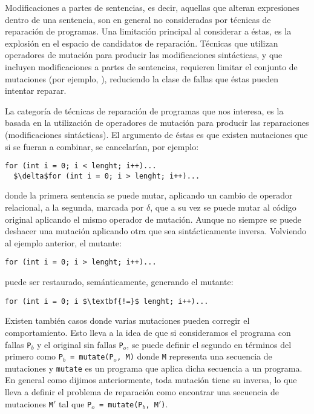 Modificaciones a partes de sentencias, es decir, aquellas que alteran expresiones dentro de una sentencia, son en general no consideradas por t\'ecnicas de reparaci\'on de programas. Una limitaci\'on principal al considerar a \'estas, es la explosi\'on en el espacio de candidatos de reparaci\'on. T\'ecnicas que utilizan operadores de mutaci\'on para producir las modificaciones sint\'acticas, y que incluyen modificaciones a partes de sentencias, requieren limitar el conjunto de mutaciones (por ejemplo, \cite{bibliography.repair.GopinathMK11}), reduciendo la clase de fallas que \'estas pueden intentar reparar.

La categor\'ia de t\'ecnicas de reparaci\'on de programas que nos interesa, es la basada en la utilizaci\'on de operadores de mutaci\'on para producir las reparaciones (modificaciones sint\'acticas). El argumento de \'estas es que existen mutaciones que si se fueran a combinar, se cancelar\'ian, por ejemplo:
\begin{lstlisting}[mathescape=true]
  for (int i = 0; i < lenght; i++)...
  $\delta$for (int i = 0; i > lenght; i++)...
\end{lstlisting}
donde la primera sentencia se puede mutar, aplicando un cambio de operador relacional, a la segunda, marcada por $\delta$, que a su vez se puede mutar al c\'odigo original aplicando el mismo operador de mutaci\'on. Aunque no siempre se puede deshacer una mutaci\'on aplicando otra que sea sint\'acticamente inversa. 
Volviendo al ejemplo anterior, el mutante:
\begin{lstlisting}[mathescape=true]
  for (int i = 0; i > lenght; i++)...
\end{lstlisting}
puede ser restaurado, sem\'anticamente, generando el mutante:
\begin{lstlisting}[mathescape=true]
  for (int i = 0; i $\textbf{!=}$ lenght; i++)...
\end{lstlisting}
Existen tambi\'en casos donde varias mutaciones pueden corregir el comportamiento. Esto lleva a la idea de que si consideramos el programa con fallas \texttt{P$_b$} y el original sin fallas \texttt{P$_o$}, se puede definir el segundo en t\'erminos del primero como \texttt{P$_b$ = mutate(P$_o$, M)} donde \texttt{M} representa una secuencia de mutaciones y \texttt{mutate} es un programa que aplica dicha secuencia a un programa. En general como dijimos anteriormente, toda mutaci\'on tiene su inversa, lo que lleva a definir el problema de reparaci\'on como encontrar una secuencia de mutaciones \texttt{M$\prime$} tal que \texttt{P$_o$ = mutate(P$_b$, M$\prime$)}.

